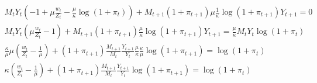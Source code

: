 \documentclass[a4paper,10pt]{article}
\begin{document}
	\begin{gather}
		M_t Y_t \left(-1 + \mu\frac{w_t}{Z_t} - \frac{\mu}{\kappa}\log\left(1+\pi_t\right) \right) + M_{t+1}(1+\pi_{t+1})\mu\frac{1}{\kappa}\log\left(1+\pi_{t+1}\right) Y_{t+1} = 0 \nonumber \\
		M_t Y_t \left(\mu \frac{w_t}{Z_t} - 1\right) + M_{t+1} (1+\pi_{t+1})\frac{\mu}{\kappa} \log(1+\pi_{t+1})Y_{t+1} = \frac{\mu}{\kappa}M_t Y_t\log(1+\pi_{t}) \nonumber \\
		\frac{\kappa}{\mu}\mu\left(\frac{w_t}{Z_t} - \frac{1}{\mu}\right) + (1+\pi_{t+1})\frac{M_{t+1}}{M_t}\frac{Y_{t+1}}{Y_t} \frac{\mu}{\kappa}\frac{\kappa}{\mu}\log(1+\pi_{t+1}) = \log(1+\pi_t)\nonumber \\
		\kappa \left(\frac{w_t}{Z_t} - \frac{1}{\mu}\right) + (1+\pi_{t+1})\frac{M_{t+1}}{M_t}\frac{Y_{t+1}}{Y_t} \log(1+\pi_{t+1}) = \log(1+\pi_t)
	\end{gather}
	
\end{document}
